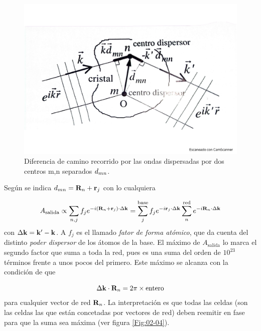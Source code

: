 \begin{figure}[h!] \centering
    \includegraphics[scale=0.35]{Cuerpo/Ch_02/Fotos_libro 2.pdf}
    \caption{Diferencia de camino recorrido por las ondas dispersadas por dos centros m,n separados $\mathbf{}d_{mn}$.}
    \label{Fig:02-02}
\end{figure}

Según se indica $\mathbf{}d_{mn}=\mathbf{R}_n+\mathbf{r}_j$ con lo cualquiera

\begin{equation}
    A_{\text{salida}} \propto  \sum_{n,j} f_j e^{-i (\mathbf{R}_n + \mathbf{r}_j) \cdot \Delta \mathbf{k}} = \sum_j^{\text{base}} f_j e^{-i \mathbf{r}_j \cdot \Delta \mathbf{k}} \sum_{n}^{\text{red}} e^{-i\mathbf{R}_n \cdot \Delta \mathbf{k}} \label{Ec:02-02-02}
\end{equation}
con $\Delta \mathbf{k} = \mathbf{k}' - \mathbf{k}$. A $f_j$ es el llamado \textit{fator de forma atómico}, que da cuenta del distinto \textit{poder dispersor} de los átomos de la base. El máximo de $A_{\text{salida}}$ lo marca el segundo factor que suma a toda la red, pues es una suma del orden de $10^{23}$ términos frente a unos pocos del primero. Este máximo se alcanza con la condición de que

\begin{equation}
    \Delta \mathbf{k} \cdot \mathbf{R}_n = 2 \pi \times \text{entero} \label{Ec:02-02-03}
\end{equation}
para cualquier vector de red $\mathbf{R}_n$. La interpretación es que todas las celdas (son las celdas las que están concetadas por vectores de red) deben reemitir en fase para que la suma sea máxima (ver figura \ref{Fig:02-04}).
    
